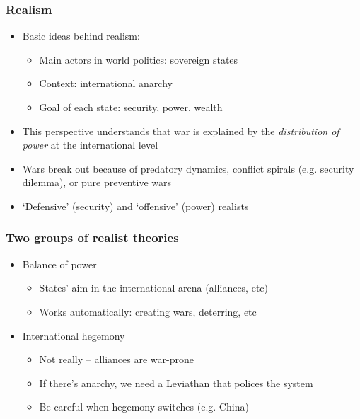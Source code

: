 \documentclass[aspectratio=43]{beamer}
\begin{document}
\begin{frame}
\frametitle{Realism}
\centering

\begin{itemize}
\item<1-> Basic ideas behind realism:
  \begin{itemize}
  \item Main actors in world politics: sovereign states
  \item Context: international anarchy
  \item Goal of each state: security, power, wealth
  \end{itemize}
\item<2-> This perspective understands that war is explained by the \textit{distribution of power} at the international level
\item<3-> Wars break out because of predatory dynamics, conflict spirals (e.g. security dilemma), or pure preventive wars
\item<4-> `Defensive' (security) and `offensive' (power) realists
\end{itemize}

\end{frame}

\begin{frame}
\frametitle{Two groups of realist theories}
\centering

\begin{itemize}
\item<1> Balance of power
  \begin{itemize}
  \item States' aim in the international arena (alliances, etc)
  \item Works automatically: creating wars, deterring, etc
  \end{itemize}
\item<2> International hegemony
  \begin{itemize}
  \item Not really -- alliances are war-prone
  \item If there's anarchy, we need a Leviathan that polices the system
  \item Be careful when hegemony switches (e.g. China)
  \end{itemize}
\end{itemize}

\end{frame}
\end{document}
